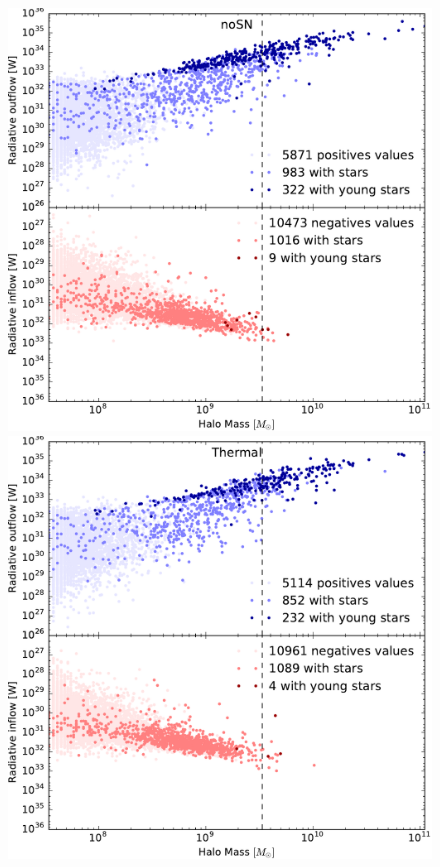 \begin{figure}
	\centering
	\includegraphics[height=.30\textheight]{img/03/flux_rad_noSN.pdf} 
	\includegraphics[height=.30\textheight]{img/03/flux_rad_therm.pdf} 

\end{figure}
